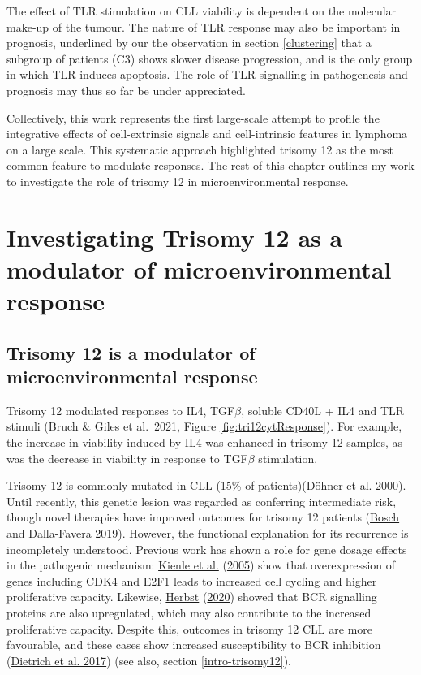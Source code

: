 \documentclass[11pt, a4paper, twosided]{book}
\begin{document}
The effect of TLR stimulation on CLL viability is dependent on the molecular make-up of the tumour. The nature of TLR response may also be important in prognosis, underlined by our the observation in section \ref{clustering} that a subgroup of patients (C3) shows slower disease progression, and is the only group in which TLR induces apoptosis. The role of TLR signalling in pathogenesis and prognosis may thus so far be under appreciated.

Collectively, this work represents the first large-scale attempt to profile the integrative effects of cell-extrinsic signals and cell-intrinsic features in lymphoma on a large scale. This systematic approach highlighted trisomy 12 as the most common feature to modulate responses. The rest of this chapter outlines my work to investigate the role of trisomy 12 in microenvironmental response.

\hypertarget{investigating-trisomy-12-as-a-modulator-of-microenvironmental-response}{%
\section{Investigating Trisomy 12 as a modulator of microenvironmental response}\label{investigating-trisomy-12-as-a-modulator-of-microenvironmental-response}}

\hypertarget{trisomy12-modulator}{%
\subsection{Trisomy 12 is a modulator of microenvironmental response}\label{trisomy12-modulator}}

Trisomy 12 modulated responses to IL4, TGF\(\beta\), soluble CD40L + IL4 and TLR stimuli (Bruch \& Giles et al.~2021, Figure \ref{fig:tri12cytResponse}). For example, the increase in viability induced by IL4 was enhanced in trisomy 12 samples, as was the decrease in viability in response to TGF\(\beta\) stimulation.

Trisomy 12 is commonly mutated in CLL (15\% of patients)(\protect\hyperlink{ref-Dohner2000}{Döhner et al. 2000}). Until recently, this genetic lesion was regarded as conferring intermediate risk, though novel therapies have improved outcomes for trisomy 12 patients (\protect\hyperlink{ref-Bosch2019}{Bosch and Dalla-Favera 2019}). However, the functional explanation for its recurrence is incompletely understood. Previous work has shown a role for gene dosage effects in the pathogenic mechanism: \protect\hyperlink{ref-Kienle2005}{Kienle et al.} (\protect\hyperlink{ref-Kienle2005}{2005}) show that overexpression of genes including CDK4 and E2F1 leads to increased cell cycling and higher proliferative capacity. Likewise, \protect\hyperlink{ref-HerbstThesis}{Herbst} (\protect\hyperlink{ref-HerbstThesis}{2020}) showed that BCR signalling proteins are also upregulated, which may also contribute to the increased proliferative capacity. Despite this, outcomes in trisomy 12 CLL are more favourable, and these cases show increased susceptibility to BCR inhibition (\protect\hyperlink{ref-JCIpaper}{Dietrich et al. 2017}) (see also, section \ref{intro-trisomy12}).
\end{document}
